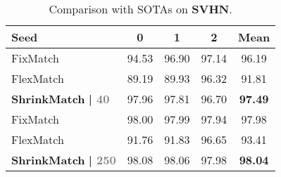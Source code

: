 \documentclass[10pt,twocolumn,letterpaper]{article}
\begin{document}
\begin{table}[t]
\centering
\small
\setlength\tabcolsep{2.9mm}
    \centering
    \begin{tabular}{l|ccc|c}
    \toprule
    
    Seed & 0 & 1 & 2 & Mean \\
    
    \midrule
    
    FixMatch \cite{fixmatch} & 94.53 & 96.90 & 97.14 & 96.19 \\
    
    FlexMatch \cite{flexmatch} & 89.19 & 89.93 & 96.32 & 91.81 \\
    
    \textbf{ShrinkMatch} \textbf{| \textcolor{gray}{\footnotesize{40}}} & 97.96 & 97.81 & 96.70 & \textbf{97.49} \\
    
    \midrule
    
    FixMatch \cite{fixmatch} & 98.00 & 97.99 & 97.94 & 97.98 \\
    
    FlexMatch \cite{flexmatch} & 91.76 & 91.83 & 96.65 & 93.41 \\
    
    \textbf{ShrinkMatch} \textbf{| \textcolor{gray}{\footnotesize{250}}} & 98.08 & 98.06 & 97.98 & \textbf{98.04} \\
    
    \bottomrule

    \end{tabular}
    \vspace{-1mm}
    \caption{Comparison with SOTAs on \textbf{SVHN}.}
    \vspace{-2mm}
    \label{tab:svhn}
\end{table} 
\end{document}
